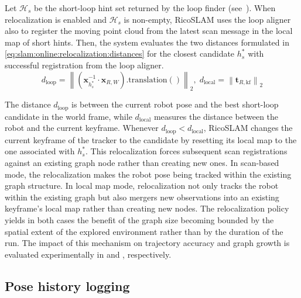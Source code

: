 Let $\mathcal{H}_s$ be the short-loop hint set returned by the loop finder
(see~). When relocalization is enabled
and $\mathcal{H}_s$ is non-empty, RicoSLAM uses the loop aligner also to
register the moving point cloud from the latest scan message in the local map
of short hints. Then, the system evaluates the two distances formulated in
\eqref{eq:slam:online:relocalization:distances} for the closest candidate
$h_s^*$ with successful registration from the loop aligner.
\begin{equation}
\label{eq:slam:online:relocalization:distances}
d_{\mathrm{loop}} =
\left\|\left(\mathbf{x}_{h_s^*}^{-1}\cdot\mathbf{x}_{R,W}\right)
       .\mathrm{translation}()\right\|_2,
\;
d_{\mathrm{local}} =
\left\|\mathbf{t}_{R,\mathrm{kf}}\right\|_2
\end{equation}

The distance $d_{\mathrm{loop}}$ is between the current robot pose and
the best short-loop candidate in the world frame, while $d_{\mathrm{local}}$
measures the distance between the robot and the current keyframe. Whenever
$d_{\mathrm{loop}} < d_{\mathrm{local}}$, RicoSLAM changes the current keyframe
of the tracker to the candidate by resetting its local map to the one
associated with $h_s^*$. This relocalization forces subsequent scan registrations
against an existing graph node rather than creating new ones.
In scan-based mode, the relocalization makes the robot pose being tracked
within the existing graph structure. In local map mode, relocalization not only
tracks the robot within the existing graph but also mergers new observations
into an existing keyframe's local map rather than creating new nodes.
The relocalization policy yields in both cases the benefit of the graph size
becoming bounded by the spatial extent of the explored environment rather than
by the duration of the run. The impact of this mechanism on trajectory accuracy
and graph growth is evaluated experimentally in
 and
, respectively.

\subsection{Pose history logging}\label{sec:slam:online:pose-history}

